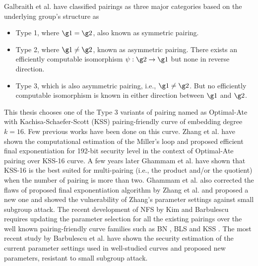 Galbraith et al. \cite{galbraith2008pairings} have classified pairings as three major categories based on the underlying group's structure as 
\begin{itemize}
\item Type 1, where $\g1 = \g2$, also known as symmetric pairing. 
\item Type 2, where $\g1 \neq \g2$, known as asymmetric pairing. There exists an efficiently computable isomorphism $\psi : \g2 \to \g1$ but none in reverse direction.
\item Type 3, which is also asymmetric pairing, i.e., $\g1 \neq \g2$. But no efficiently computable isomorphism is known in either direction  between $\g1$ and $\g2$.
\end{itemize}
This thesis chooses one of the Type 3 variants of pairing named as Optimal-Ate \cite{DBLP:journals/tit/Vercauteren10} with Kachisa-Schaefer-Scott (KSS) \cite{EPRINT:KacSchSco07} pairing-friendly curve of embedding degree $k=16$. 
Few previous works have been done on this  curve. 
Zhang et al. \cite{INDOCRYPT:ZhaLin12} have shown the computational estimation of the Miller's loop and proposed efficient final exponentiation for 192-bit security level in the context of Optimal-Ate pairing over KSS-16 curve. 
A few years later Ghammam et al. \cite{EPRINT:GhaFou16b} have shown that KSS-16 is the best suited for multi-pairing (i.e., the product and/or the quotient) when the number of pairing is more than two. 
Ghammam et al. \cite{EPRINT:GhaFou16b} also corrected the flaws of proposed final exponentiation algorithm by Zhang et al. \cite{INDOCRYPT:ZhaLin12} and proposed a new one and showed the vulnerability of Zhang's parameter settings against small subgroup attack. 
The recent development of NFS by Kim and Barbulescu \cite{C:KimBar16} requires updating the parameter selection for all the existing pairings over the well known pairing-friendly curve families such as BN \cite{SAC:BarNae05}, BLS \cite{EPRINT:FreScoTes06} and KSS \cite{EPRINT:KacSchSco07}.
The most recent study by Barbulescu et al. \cite{sylvain_new_param} have shown the security estimation of the current parameter settings used in well-studied curves and proposed new parameters, resistant to small subgroup attack.

